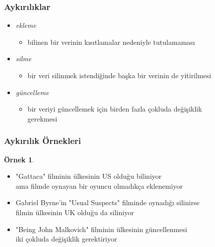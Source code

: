 \documentclass[dvipsnames]{beamer}
\theoremstyle{definition}
\theoremstyle{example}
\newtheorem{ornek}[theorem]{Örnek}
\theoremstyle{plain}
\begin{document}
\begin{frame}
  \frametitle{Aykırılıklar}

  \begin{itemize}
    \item \emph{ekleme}
    \begin{itemize}
      \item bilinen bir verinin kısıtlamalar nedeniyle tutulamaması
    \end{itemize}

    \pause
    \item \emph{silme}
    \begin{itemize}
        \item bir veri silinmek istendiğinde başka bir verinin de yitirilmesi
    \end{itemize}

    \pause
    \item \emph{güncelleme}
    \begin{itemize}
      \item bir veriyi güncellemek için birden fazla çokluda değişiklik\\
        gerekmesi
    \end{itemize}
  \end{itemize}
\end{frame}

\begin{frame}
  \frametitle{Aykırılık Örnekleri}

  \begin{ornek}
    \begin{itemize}
      \item "Gattaca" filminin ülkesinin US olduğu biliniyor\\
	ama filmde oynayan bir oyuncu olmadıkça eklenemiyor

      \pause
      \item Gabriel Byrne'in "Usual Suspects" filminde oynadığı silinirse\\
        filmin ülkesinin UK olduğu da siliniyor

      \pause
      \item "Being John Malkovich" filminin ülkesinin güncellenmesi\\
        iki çokluda değişiklik gerektiriyor
    \end{itemize}
  \end{ornek}
\end{frame}
\end{document}
